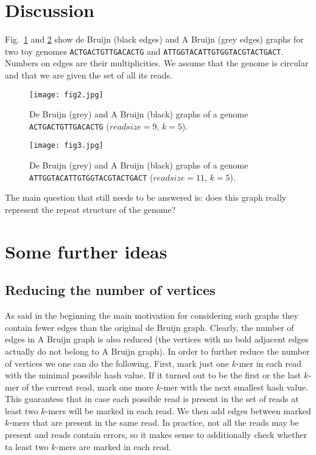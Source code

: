 \documentclass[12pt]{article}
\begin{document}
\section{Discussion}
Fig.~\ref{fig2} and \ref{fig3} show de Bruijn (black edges) and A Bruijn (grey edges) graphs for two toy genomes 
{\tt ACTGACTGTTGACACTG} and {\tt ATTGGTACATTGTGGTACGTACTGACT}. Numbers on edges are their multiplicities. 
We assume that the genome is circular and that we are given the set of all its reads.

\begin{figure}
\caption{De Bruijn (grey) and A Bruijn (black) graphs of a genome {\tt ACTGACTGTTGACACTG} ($readsize=9$, $k=5$).}\label{fig2}
\begin{center}\texttt{[image: fig2.jpg]}\end{center}
\end{figure}

\begin{figure}
\caption{De Bruijn (grey) and A Bruijn (black) graphs of a genome {\tt ATTGGTACATTGTGGTACGTACTGACT} ($readsize=11$, $k=5$).}\label{fig3}
\begin{center}\texttt{[image: fig3.jpg]}\end{center}
\end{figure}


The main question that still needs to be answered is:
does this graph really represent the repeat structure of the genome?

\section{Some further ideas}
\subsection{Reducing the number of vertices}
As said in the beginning the main motivation for considering such graphs
they contain fewer edges than the original de Bruijn graph. Clearly, the number of edges in
A Bruijn graph is also reduced (the vertices with no bold adjacent edges actually do not belong
to A Bruijn graph). In order to further reduce the number of vertices we one can do the following.
First, mark just one $k$-mer in each read with the minimal possible hash value. If it turned out to be
the first or the last $k$-mer of the current read, mark one more $k$-mer with the next smallest hash 
value. This guarantess that in case each possible read is present in the set of reads
at least two $k$-mers will be marked in each read. We then add edges between marked $k$-mers
that are present in the same read. In practice, not all the reads may be present and 
reads contain errors, so it makes sense to additionally check whether ta least two $k$-mers
are marked in each read.
\end{document}
